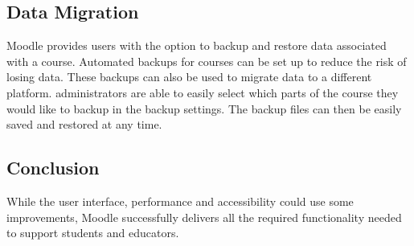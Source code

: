 \subsection{Data Migration}
Moodle provides users with the option to backup and restore data associated with a course. \cite{moodleBackupAndRestore}
Automated backups for courses can be set up to reduce the risk of losing data.
These backups can also be used to migrate data to a different platform. \cite{moodleBackup}
administrators are able to easily select which parts of the course they would like to backup in the backup settings.
The backup files can then be easily saved and restored at any time. \cite{moodleRestore}

\subsection{Conclusion}
While the user interface, performance and accessibility could use some improvements, Moodle successfully delivers all the required functionality needed to support students and educators.